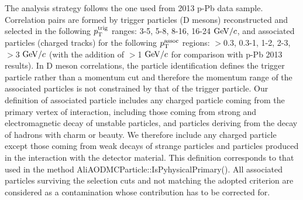 The analysis strategy follows the one used from 2013 p-Pb data sample. Correlation pairs are formed by
trigger particles (D mesons) reconstructed and selected in the following $p_{\rm T}^{\rm trig}$ ranges: 3-5, 5-8, 8-16, 16-24 $\mathrm{GeV}/c$, and associated particles (charged tracks) for the following $p_{\rm T}^{\rm assoc}$ regions: $>$0.3, 0.3-1, 1-2, 2-3, $>$3 $\mathrm{GeV}/c$ (with the addition of $>$1 $\mathrm{GeV}/c$ for comparison with p-Pb 2013 results). In D meson correlations, the particle identification
defines the trigger particle rather than a momentum cut and therefore the momentum
range of the associated particles is not constrained by that of the trigger particle. Our definition of
associated particle includes any charged particle coming from the primary vertex of interaction, including
those coming from strong and electromagnetic decay of unstable particles, and particles deriving from the
decay of hadrons with charm or beauty.
We therefore include any charged particle except those coming from weak decays of strange particles and particles produced in the interaction with the detector material. This definition corresponds to that used in the method AliAODMCParticle::IsPyhysicalPrimary().
All associated particles surviving the selection cuts and not matching the adopted criterion are considered as a contamination whose contribution has to be corrected for. \\

